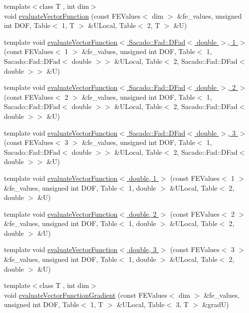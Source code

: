 \begin{DoxyCompactItemize}
\item 
{\footnotesize template$<$class T , int dim$>$ }\\void \hyperlink{group___evaluation_functions_gab9e164be1be244df81c932426a4bd513}{evaluate\-Vector\-Function} (const F\-E\-Values$<$ dim $>$ \&fe\-\_\-values, unsigned int D\-O\-F, Table$<$ 1, T $>$ \&U\-Local, Table$<$ 2, T $>$ \&U)
\item 
template void \hyperlink{function_evaluations_8cc_a668c45fc65b525a83192a67dd35571c6}{evaluate\-Vector\-Function$<$ Sacado\-::\-Fad\-::\-D\-Fad$<$ double $>$, 1 $>$} (const F\-E\-Values$<$ 1 $>$ \&fe\-\_\-values, unsigned int D\-O\-F, Table$<$ 1, Sacado\-::\-Fad\-::\-D\-Fad$<$ double $>$$>$ \&U\-Local, Table$<$ 2, Sacado\-::\-Fad\-::\-D\-Fad$<$ double $>$$>$ \&U)
\item 
template void \hyperlink{function_evaluations_8cc_a28ceac224510d9b9753dbe934874d56b}{evaluate\-Vector\-Function$<$ Sacado\-::\-Fad\-::\-D\-Fad$<$ double $>$, 2 $>$} (const F\-E\-Values$<$ 2 $>$ \&fe\-\_\-values, unsigned int D\-O\-F, Table$<$ 1, Sacado\-::\-Fad\-::\-D\-Fad$<$ double $>$$>$ \&U\-Local, Table$<$ 2, Sacado\-::\-Fad\-::\-D\-Fad$<$ double $>$$>$ \&U)
\item 
template void \hyperlink{function_evaluations_8cc_a49bf826d13c295bef33c6d320e96a6ee}{evaluate\-Vector\-Function$<$ Sacado\-::\-Fad\-::\-D\-Fad$<$ double $>$, 3 $>$} (const F\-E\-Values$<$ 3 $>$ \&fe\-\_\-values, unsigned int D\-O\-F, Table$<$ 1, Sacado\-::\-Fad\-::\-D\-Fad$<$ double $>$$>$ \&U\-Local, Table$<$ 2, Sacado\-::\-Fad\-::\-D\-Fad$<$ double $>$$>$ \&U)
\item 
template void \hyperlink{function_evaluations_8cc_adab42860d3e6d233bc937b4574606f60}{evaluate\-Vector\-Function$<$ double, 1 $>$} (const F\-E\-Values$<$ 1 $>$ \&fe\-\_\-values, unsigned int D\-O\-F, Table$<$ 1, double $>$ \&U\-Local, Table$<$ 2, double $>$ \&U)
\item 
template void \hyperlink{function_evaluations_8cc_a418401c6810307bd7073ff5f72b3bd77}{evaluate\-Vector\-Function$<$ double, 2 $>$} (const F\-E\-Values$<$ 2 $>$ \&fe\-\_\-values, unsigned int D\-O\-F, Table$<$ 1, double $>$ \&U\-Local, Table$<$ 2, double $>$ \&U)
\item 
template void \hyperlink{function_evaluations_8cc_af05742550c00c35879af970241b9f6fc}{evaluate\-Vector\-Function$<$ double, 3 $>$} (const F\-E\-Values$<$ 3 $>$ \&fe\-\_\-values, unsigned int D\-O\-F, Table$<$ 1, double $>$ \&U\-Local, Table$<$ 2, double $>$ \&U)
\item 
{\footnotesize template$<$class T , int dim$>$ }\\void \hyperlink{group___evaluation_functions_ga84eb2ee714466f113c96fcf6a9fd23e8}{evaluate\-Vector\-Function\-Gradient} (const F\-E\-Values$<$ dim $>$ \&fe\-\_\-values, unsigned int D\-O\-F, Table$<$ 1, T $>$ \&U\-Local, Table$<$ 3, T $>$ \&grad\-U)

\end{DoxyCompactItemize}
